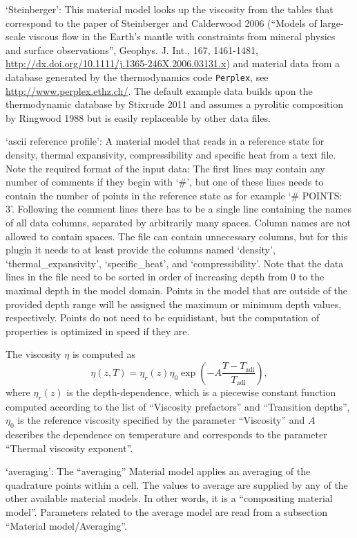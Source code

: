 \begin{itemize}
`Steinberger': This material model looks up the viscosity from the tables that correspond to the paper of Steinberger and Calderwood 2006 (``Models of large-scale viscous flow in the Earth's mantle with constraints from mineral physics and surface observations'', Geophys. J. Int., 167, 1461-1481, \url{http://dx.doi.org/10.1111/j.1365-246X.2006.03131.x}) and material data from a database generated by the thermodynamics code \texttt{Perplex}, see \url{http://www.perplex.ethz.ch/}. The default example data builds upon the thermodynamic database by Stixrude 2011 and assumes a pyrolitic composition by Ringwood 1988 but is easily replaceable by other data files. 

`ascii reference profile': A material model that reads in a reference state for density, thermal expansivity, compressibility and specific heat from a text file. 
Note the required format of the input data: The first lines may contain any number of comments if they begin with `#', but one of these lines needs to contain the number of points in the reference state as for example `# POINTS: 3'. Following the comment lines there has to be a single line containing the names of all data columns, separated by arbitrarily many spaces. Column names are not allowed to contain spaces. The file can contain unnecessary columns, but for this plugin it needs to at least provide the columns named `density', `thermal\_expansivity', `specific\_heat', and `compressibility'. Note that the data lines in the file need to be sorted in order of increasing depth from 0 to the maximal depth in the model domain. Points in the model that are outside of the provided depth range will be assigned the maximum or minimum depth values, respectively. Points do not need to be equidistant, but the computation of properties is optimized in speed if they are.

The viscosity $\eta$ is computed as \begin{equation}\eta(z,T) = \eta_r(z) \eta_0 \exp\left(-A \frac{T - T_{\text{adi}}}{T_{\text{adi}}}\right),\end{equation}where $\eta_r(z)$ is the depth-dependence, which is a piecewise constant function computed according to the list of ``Viscosity prefactors'' and ``Transition depths'', $\eta_0$ is the reference viscosity specified by the parameter ``Viscosity'' and $A$ describes the dependence on temperature and corresponds to the parameter ``Thermal viscosity exponent''.

`averaging': The ``averaging'' Material model applies an averaging of the quadrature points within a cell. The values to average are supplied by any of the other available material models. In other words, it is a ``compositing material model''. Parameters related to the average model are read from a subsection ``Material model/Averaging''.


\end{itemize}
